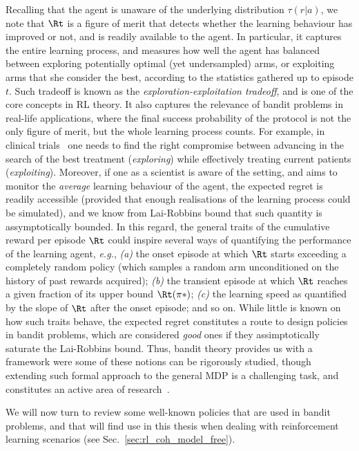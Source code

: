 Recalling that the agent is unaware of the underlying distribution $\tau(r|a)$, we note that $\Rt$ is a figure of merit that detects whether the learning behaviour has improved or not, and is readily available to the agent. In particular, it captures the entire learning process, and measures how well the agent has balanced between exploring potentially optimal (yet undersampled) arms, or exploiting arms that she consider the best, according to the statistics gathered up to episode $t$. Such tradeoff is known as the \textit{exploration-exploitation tradeoff}, and is one of the core concepts in RL theory. It also captures the relevance of bandit problems in real-life applications, where the final success probability of the protocol is not the only figure of merit, but the whole learning process counts. For example, in clinical trials~\cite{Thompson1933} one needs to find the right compromise between advancing in the search of the best treatment (\textit{exploring}) while effectively treating current patients (\textit{exploiting}). Moreover, if one as a scientist is aware of the setting, and aims to monitor the \textit{average} learning behaviour of the agent, the expected regret is readily accessible (provided that enough realisations of the learning process could be simulated), and we know from Lai-Robbins bound that such quantity is assymptotically bounded.
In this regard, the general traits of the cumulative reward per episode $\Rt$ could inspire several ways of quantifying the performance of the learning agent, \textit{e.g.}, \textit{(a)} the onset episode at which $\Rt$ starts exceeding a completely random policy (which samples a random arm unconditioned on the history of past rewards acquired); \textit{(b)} the transient episode at which $\Rt$ reaches a given fraction of its upper bound $\Rt(\pi*)$;  \textit{(c)} the learning speed as quantified by the slope of $\Rt$ after the onset episode; and so on. While little is known on how such traits behave, the expected regret constitutes a route to design policies in bandit problems, which are considered \textit{good} ones if they assimptotically saturate the Lai-Robbins bound. Thus, bandit theory provides us with a framework were some of these notions can be rigorously studied, though extending such formal approach to the general MDP is a challenging task, and constitutes an active area of research~\cite{banditbook, regRL1, regRL2, thesisRegret, QlearningUCB}.%

We will now turn to review some well-known policies that are used in bandit problems, and that will find use in this thesis when dealing with reinforcement learning scenarios (see Sec.~\ref{sec:rl_coh_model_free}).

